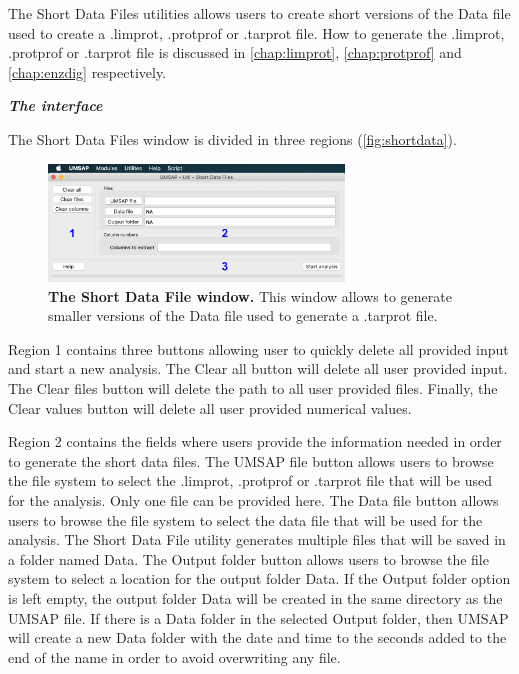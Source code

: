 The Short Data Files utilities allows users to create short versions of the Data file used to create a .limprot, .protprof or .tarprot file. How to generate the .limprot, .protprof or .tarprot file is discussed in \autoref{chap:limprot}, \autoref{chap:protprof} and \autoref{chap:enzdig} respectively.

\textit{\textbf{The interface}}

The Short Data Files window is divided in three regions (\autoref{fig:shortdata}).

\begin{figure}[h]
	\centering
	\includegraphics[width=0.7\textwidth]{./IMAGES/UTIL-SHORTDF-WINDOW/util-shortdf.jpg}	    
	\caption[The Short Data File window]{\textbf{The Short Data File window.} This window allows to generate smaller versions of the Data file used to generate a .tarprot file.} 
	\label{fig:shortdata}
	\vspace{-5pt} 	
\end{figure} 

Region \num{1} contains three buttons allowing user to quickly delete all provided input and start a new analysis. The Clear all button will delete all user provided input. The Clear files button will delete the path to all user provided files. Finally, the Clear values button will delete all user provided numerical values.

Region \num{2} contains the fields where users provide the information needed in order to generate the short data files. The UMSAP file button allows users to browse the file system to select the .limprot, .protprof or .tarprot file that will be used for the analysis. Only one file can be provided here. The Data file button allows users to browse the file system to select the data file that will be used for the analysis. The Short Data File utility generates multiple files that will be saved in a folder named Data. The Output folder button allows users to browse the file system to select a location for the output folder Data. If the Output folder option is left empty, the output folder Data will be created in the same directory as the UMSAP file. If there is a Data folder in the selected Output folder, then UMSAP will create a new Data folder with the date and time to the seconds added to the end of the name in order to avoid overwriting any file. 

